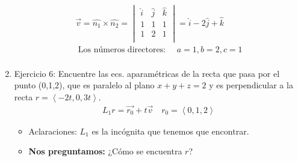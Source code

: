 \documentclass{article}
\begin{document}
\begin{enumerate}
\begin{align*}
                \vec{v} = \hat{n_1} \times \hat{n_2} = \begin{vmatrix}
                    \hat{i} & \hat{j} & \hat{k} \\
                    1 & 1 & 1 \\ 
                    1 & 2 & 1 \\ 
                \end{vmatrix}   = \hat{i} -2\hat{j} +\hat{k} \\ 
                \text{  Los números directores:   } \quad a=1, b=2, c= 1 \\ 
            \end{align*}
    
    \item Ejercicio 6: Encuentre las ecs. aparamétricas de la recta que pasa por el punto (0,1,2), que es paralelo al plano $x+y+z=2$ y es perpendicular a la recta $r = \left\langle -2t,0,3t \right\rangle $.
            \begin{align*}
               L_1 r= \vec{r_0}+t \vec{v} \quad r_0 = \left\langle 0,1,2 \right\rangle 
            \end{align*}
            \begin{itemize}
                
                \item Aclaraciones: $L_1$ es la incógnita que tenemos que encontrar.
                \item \textbf{Nos preguntamos:} ¿Cómo se encuentra $r$?
                

\end{itemize}
\end{enumerate}
\end{document}
